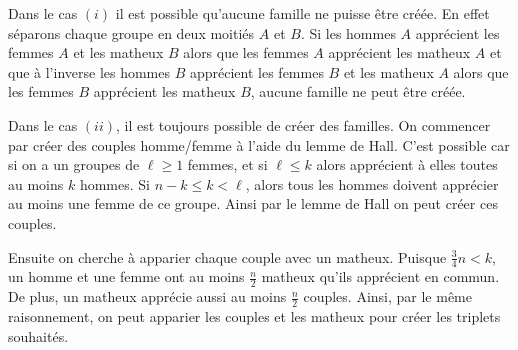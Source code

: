 \begin{sol}
Dans le cas $(i)$ il est possible qu'aucune famille ne puisse être créée. En effet séparons chaque groupe en deux moitiés $A$ et $B$. Si les hommes $A$ apprécient les femmes $A$ et les matheux $B$ alors que les femmes $A$ apprécient les matheux $A$ et que à l'inverse les hommes $B$ apprécient les femmes $B$ et les matheux $A$ alors que les femmes $B$ apprécient les matheux $B$, aucune famille ne peut être créée.

\medskip

Dans le cas $(ii)$, il est toujours possible de créer des familles. On commencer par créer des couples homme/femme à l'aide du lemme de Hall. C'est possible car si on a un groupes de $\ell\ge 1$ femmes, et si $\ell\le k$ alors apprécient à elles toutes au moins $k$ hommes. Si $n - k \le k < \ell$, alors tous les hommes doivent apprécier au moins une femme de ce groupe. Ainsi par le lemme de Hall on peut créer ces couples.

\medskip
Ensuite on cherche à apparier chaque couple avec un matheux. Puisque $\frac 34 n < k$, un homme et une femme ont au moins $\frac n2$ matheux qu'ils apprécient en commun. De plus, un matheux apprécie aussi au moins $\frac n2$ couples. Ainsi, par le même raisonnement, on peut apparier les couples et les matheux pour créer les triplets souhaités.
\end{sol}


